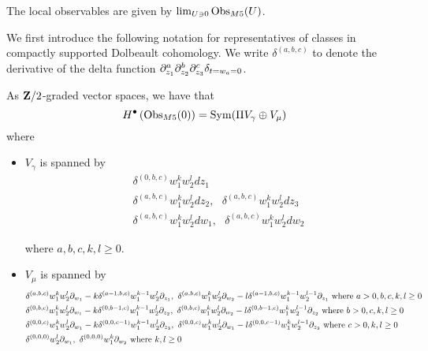 The local observables are given by $\lim _{U\ni 0} \operatorname{Obs}_{M5}(U)$.

We first introduce the following notation for representatives of classes in compactly supported Dolbeault cohomology. We write $\delta^{(a,b,c)}$ to denote the derivative of the delta function $\partial_{z_{1}}^{a}\partial_{z_{2}}^{b}\partial_{z_{3}}^{c}\delta_{t=w_{a}=0}$.

\begin{lem}
  As $\mathbf{Z}/2$-graded vector spaces, we have that \[H^{\bullet}\left ( \operatorname{Obs}_{M5}(0)\right )=\operatorname{Sym} (\Pi V_{\gamma}\oplus  V_{\mu})\] where
  \begin{itemize}
    \item $V_{\gamma}$ is spanned by
          \begin{align}
            & \delta^{(0,b,c)}w_{1}^{k}w_{2}^{l}dz_{1} \\
            & \delta^{(a,b,c)}w_{1}^{k}w_{2}^{l}dz_{2}, \ \ \
             \delta^{(a,b,c)}w_{1}^{k}w_{2}^{l}dz_{3} \\
            & \delta^{(a,b,c)}w_{1}^{k}w_{2}^{l}dw_{1}, \ \ \
            \delta^{(a,b,c)}w_{1}^{k}w_{2}^{l}dw_{2}
          \end{align}

          where $a, b, c, k, l \geq 0$.
    \item $V_{\mu}$ is spanned by
          \begin{align}
            & \delta^{(a,b,c)}w_{1}^{k}w_{2}^{l}\del_{w_1}-k\delta^{(a-1,b, c)}w_{1}^{k-1}w_{2}^{l}\del_{z_{1}},\
             \delta^{(a,b,c)}w_{1}^{k}w_{2}^{l}\del_{w_2}-l\delta^{(a-1,b, c)}w_{1}^{k-1}w_{2}^{l-1}\del_{z_{1}}\text{ where }a > 0, b,c,k,l \geq 0 \\
            & \delta^{(0,b,c)}w_{1}^{k}w_{2}^{l}\del_{w_1}-k\delta^{(0,b-1,c)}w_{1}^{k-1}w_{2}^{l}\del_{z_{2}}, \ \delta^{(0,b,c)}w_{1}^{k}w_{2}^{l}\del_{w_2}-l\delta^{(0,b-1,c)}w_{1}^{k}w_{2}^{l-1}\del_{z_{2}}\text{ where }b > 0,c,k,l \geq 0 \\
            & \delta^{(0,0,c)}w_{1}^{k}w_{2}^{l}\del_{w_1}-k\delta^{(0,0,c-1)}w_{1}^{k-1}w_{2}^{l}\del_{z_{3}}, \ \delta^{(0,0,c)}w_{1}^{k}w_{2}^{l}\del_{w_1}-l\delta^{(0,0,c-1)}w_{1}^{k}w_{2}^{l-1}\del_{z_{3}}\text{ where } c > 0,k,l \geq 0 \\
            & \delta^{(0,0,0)}w_{2}^{l}\del_{w_1}, \ \delta^{(0,0,0)}w_{1}^{k}\del_{w_2}\text{ where }k,l \geq 0
          \end{align}
  \end{itemize}
\end{lem}
